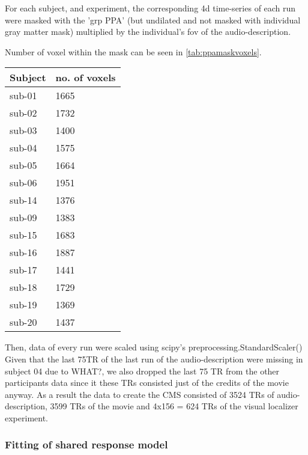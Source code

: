 For each subject, and experiment, the corresponding 4d time-series of each run
were masked with the 'grp PPA' (but undilated and not masked with individual
gray matter mask) multiplied by the individual's \ac{fov} of the
audio-description.

%
Number of voxel within the mask can be seen in \ref{tab:ppamaskvoxels}.

\begin{table*}[btp]
\caption{Number of voxels within the union of individual PPAs projected back
    into individuals' subject-space.}
\label{tab:ppamaskvoxels}
\begin{tabular}{ll}
\toprule
\textbf{Subject} & \textbf{no. of voxels} \\
\midrule
sub-01 & 1665 \tabularnewline
sub-02 & 1732 \tabularnewline
sub-03 & 1400 \tabularnewline
sub-04 & 1575 \tabularnewline
sub-05 & 1664 \tabularnewline
sub-06 & 1951 \tabularnewline
sub-14 & 1376 \tabularnewline
sub-09 & 1383 \tabularnewline
sub-15 & 1683 \tabularnewline
sub-16 & 1887 \tabularnewline
sub-17 & 1441 \tabularnewline
sub-18 & 1729 \tabularnewline
sub-19 & 1369 \tabularnewline
sub-20 & 1437 \tabularnewline
\bottomrule
\end{tabular}
\end{table*}

Then, data of every run were scaled using scipy's preprocessing.StandardScaler()
Given that the last 75TR of the last run of the audio-description were missing
in subject 04 due to WHAT?, we also dropped the last 75 TR from the other
participants data since it these TRs consisted just of the credits of the movie
anyway.
As a result the data to create the CMS consisted of 3524 TRs of
audio-description, 3599 TRs of the movie and 4x156 = 624 TRs of the visual
localizer experiment.

\subsubsection{Fitting of shared response model}




